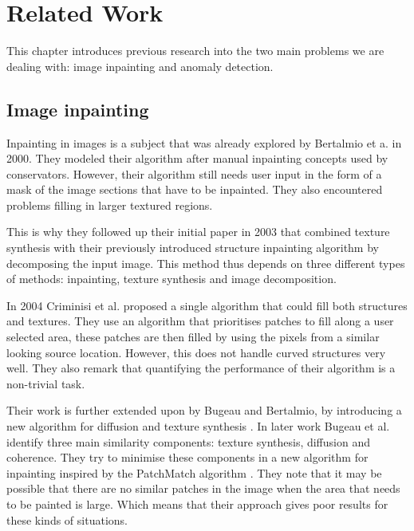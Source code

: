 \chapter{Related Work}\label{ch:related-work}

This chapter introduces previous research into the two main problems we are dealing with: image inpainting and anomaly detection.

\section{Image inpainting}
\label{sec:relwork:image-inpainting}

Inpainting in images is a subject that was already explored by Bertalmio et a. \cite{bertalmio_image_2000} in 2000. They modeled their algorithm after manual inpainting concepts used by conservators. However, their algorithm still needs user input in the form of a mask of the image sections that have to be inpainted. They also encountered problems filling in larger textured regions.

This is why they followed up their initial paper in 2003 \cite{bertalmio_simultaneous_2003} that combined texture synthesis with their previously introduced structure inpainting algorithm by decomposing the input image. This method thus depends on three different types of methods: inpainting, texture synthesis and image decomposition. 

In 2004 Criminisi et al. \cite{criminisi_region_2004} proposed a single algorithm that could fill both structures and textures. They use an algorithm that prioritises patches to fill along a user selected area, these patches are then filled by using the pixels from a similar looking source location. However, this does not handle curved structures very well. They also remark that quantifying the performance of their algorithm is a non-trivial task.

Their work is further extended upon by Bugeau and Bertalmio, by introducing a new algorithm for diffusion and texture synthesis \cite{bugeau_combining_2009}. In later work Bugeau et al. \cite{bugeau_comprehensive_2010} identify three main similarity components: texture synthesis, diffusion and coherence. They try to minimise these components in a new algorithm for inpainting inspired by the PatchMatch algorithm \cite{barnes_patchmatch_2009}. They note that it may be possible that there are no similar patches in the image when the area that needs to be painted is large. Which means that their approach gives poor results for these kinds of situations.

